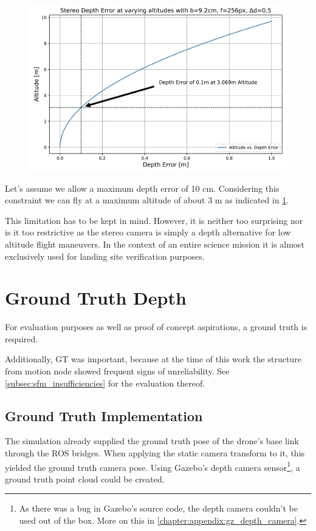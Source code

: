 \begin{figure}
    \centering
    \includegraphics[scale=0.19]{images/preparation/stereo_limit.png}
    \label{fig:stereo_limit}
\end{figure}

Let's assume we allow a maximum depth error of 10 cm. Considering this constraint we can fly at a maximum altitude of about 3 m as indicated in \cref{fig:stereo_limit}.

This limitation has to be kept in mind. However, it is neither too surprising nor is it too restrictive as the stereo camera is simply a depth alternative for low altitude flight maneuvers. In the context of an entire science mission it is almost exclusively used for landing site verification purposes.


\section{Ground Truth Depth}

For evaluation purposes as well as proof of concept aspirations, a ground truth is required. 

Additionally, GT was important, because at the time of this work the structure from motion node showed frequent signs of unreliability. See \cref{subsec:sfm_insufficiencies} for the evaluation thereof.

\subsection{Ground Truth Implementation}
The simulation already supplied the ground truth pose of the drone's base link through the ROS bridges. When applying the static camera transform to it, this yielded the ground truth camera pose. Using Gazebo's depth camera sensor\footnote[1]{As there was a bug in Gazebo's source code, the depth camera couldn't be used out of the box. More on this in \cref{chapter:appendix:gz_depth_camera}.}, a ground truth point cloud could be created.

